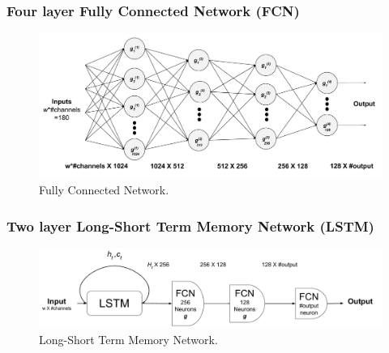\documentclass{beamer}
\begin{document}
\begin{frame}
\frametitle{Four layer Fully Connected Network (FCN)}

\begin{figure}[ht!]
    \centering
        \includegraphics[scale=0.3]{images/ffn.pdf}
    \caption{Fully Connected Network.}
    \label{fig:random}
    \vspace{-1em}
\end{figure}

\end{frame}

\begin{frame}
\frametitle{Two layer Long-Short Term Memory Network (LSTM)}

\begin{figure}[ht!]
    \centering
        \includegraphics[scale=0.3]{images/lstm.pdf}
    \caption{Long-Short Term Memory Network.}
    \label{fig:random}
    \vspace{-1em}
\end{figure}


\end{frame}
\end{document}
